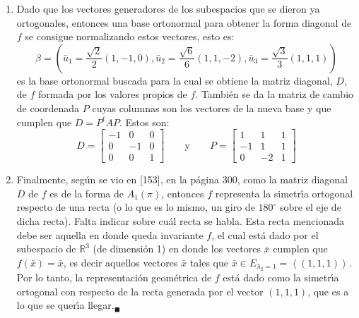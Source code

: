 \begin{solucion}
\begin{enumerate}
  \item Dado que los vectores generadores de los subespacios que se dieron ya ortogonales, entonces una base ortonormal para obtener la forma diagonal de $f$ se consigue normalizando estos vectores, esto es:
  \begin{equation*}
   \beta = \left( \bar{u}_1 = \frac{\sqrt{2}}{2}(1,-1,0), \bar{u}_2 = \frac{\sqrt{6}}{6}(1,1,-2), \bar{u}_3 = \frac{\sqrt{3}}{3}(1,1,1) \right)
  \end{equation*}
  es la base ortonormal buscada para la cual se obtiene la matriz diagonal, $D$, de $f$ formada por los valores propios de $f$. Tambi\'en se da la matriz de cambio de coordenada $P$ cuyas columnas son los vectores de la nueva base y que cumplen que $D=P^tAP$. Estos son:
  \begin{equation*}
   D = 
   \begin{bmatrix}
    -1 &  0 & 0 \\
     0 & -1 & 0 \\
     0 &  0 & 1
   \end{bmatrix}
   \qquad \text{y} \qquad
   P = 
   \begin{bmatrix}
     1 &  1 & 1 \\
    -1 &  1 & 1 \\
     0 & -2 & 1
   \end{bmatrix}
  \end{equation*}

  \item Finalmente, seg\'un se vio en [153], en la p\'agina 300, como la matriz diagonal $D$ de $f$ es de la forma de $A_1(\pi)$, entonces $f$ representa la simetr\'{\i}a ortogonal respecto de una recta (o lo que es lo mismo, un giro de $180^{\circ}$ sobre el eje de dicha recta). Falta indicar sobre cu\'al recta se habla. Esta recta mencionada debe ser aquella en donde queda invariante $f$, el cual est\'a dado por el subespacio de $\mathbb{R}^3$ (de dimensi\'on 1) en donde los vectores $\bar{x}$ cumplen que $f(\bar{x}) = \bar{x}$, es decir aquellos vectores $\bar{x}$ tales que $\bar{x}\in E_{\lambda_2=1} = \left< (1,1,1) \right>$. Por lo tanto, la representaci\'on geom\'etrica de $f$ est\'a dado como la simetr\'{\i}a ortogonal con respecto de la recta generada por el vector $(1,1,1)$, que es a lo que se quer\'{\i}a llegar.${}_{\blacksquare}$
 \end{enumerate}
\end{solucion}
